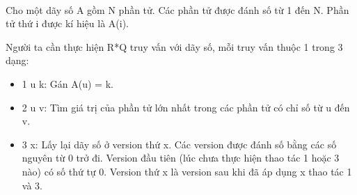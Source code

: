  

Cho một dãy số A gồm N phần tử. Các phần tử được đánh số từ 1 đến N. Phần tử thứ i được kí hiệu là A(i).

Người ta cần thực hiện R*Q truy vấn với dãy số, mỗi truy vấn thuộc 1 trong 3 dạng:
\begin{itemize}
	\item 1 u k: Gán A(u) = k.
	\item 2 u v: Tìm giá trị của phần tử lớn nhất trong các phần tử có chỉ số từ u đến v.
	\item 3 x: Lấy lại dãy số ở version thứ x. Các version được đánh số bằng các số nguyên từ 0 trở đi. Version đầu tiên (lúc chưa thực hiện thao tác 1 hoặc 3 nào) có số thứ tự 0. Version thứ x là version sau khi đã áp dụng x thao tác 1 và 3.
\end{itemize}